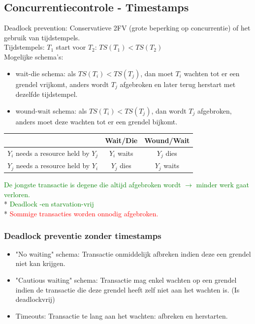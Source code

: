 \documentclass[10pt]{article}
\begin{document}
\subsection{Concurrentiecontrole - Timestamps}
Deadlock prevention: Conservatieve 2FV (grote beperking op concurrentie) of het gebruik van tijdstempels.\\
Tijdstempels: $T_1$ start voor $T_2$: $TS(T_1) < TS(T_2)$\\
Mogelijke schema's:
\begin{itemize}
\item wait-die schema: als $TS(T_i) < TS(T_j)$, dan moet $T_i$ wachten tot er een grendel vrijkomt, anders wordt $T_j$ afgebroken en later terug herstart met dezelfde tijdstempel.
\item wound-wait schema: als $TS(T_i) < TS(T_j)$, dan wordt $T_j$ afgebroken, anders moet deze wachten tot er een grendel bijkomt.
\end{itemize}
\begin{center}
\begin{tabular}{| c | c | c |} \hline
  & Wait/Die & Wound/Wait \\\hline
 $Y_i$ needs a resource held by $Y_j$ & $Y_i$ waits & $Y_j$ dies \\\hline
 $Y_j$ needs a resource held by $Y_i$ & $Y_j$ dies & $Y_j$ waits \\\hline
\end{tabular}
\end{center}
\textcolor{green}{De jongste transactie is degene die altijd afgebroken wordt $\rightarrow$ minder werk gaat verloren.}\\*
\textcolor{green}{Deadlock -en starvation-vrij}\\*
\textcolor{red}{Sommige transacties worden onnodig afgebroken.}
\subsubsection{Deadlock preventie zonder timestamps}
\begin{itemize}
\item "No waiting" schema: Transactie onmiddelijk afbreken indien deze een grendel niet kan krijgen.
\item "Cautious waiting" schema:  Transactie mag enkel wachten op een grendel indien de transactie die deze grendel heeft zelf niet aan het wachten is. (Is deadlockvrij)
\item Timeouts: Transactie te lang aan het wachten: afbreken en herstarten.
\end{itemize}
\end{document}
